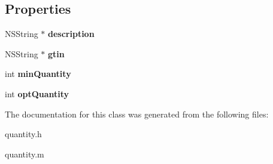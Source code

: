 \subsection*{Properties}
\begin{DoxyCompactItemize}
\item 
\hypertarget{interfacequantity_a18c045268367276323bf5e08c2f19700}{}N\+S\+String $\ast$ {\bfseries description}\label{interfacequantity_a18c045268367276323bf5e08c2f19700}

\item 
\hypertarget{interfacequantity_ad349079140178811c30dfb8d3fd2b238}{}N\+S\+String $\ast$ {\bfseries gtin}\label{interfacequantity_ad349079140178811c30dfb8d3fd2b238}

\item 
\hypertarget{interfacequantity_afd0918ba8a50587867361bd4bc9bf5f6}{}int {\bfseries min\+Quantity}\label{interfacequantity_afd0918ba8a50587867361bd4bc9bf5f6}

\item 
\hypertarget{interfacequantity_a68df267fe150aa4ed5343a03e697aa7b}{}int {\bfseries opt\+Quantity}\label{interfacequantity_a68df267fe150aa4ed5343a03e697aa7b}

\end{DoxyCompactItemize}


The documentation for this class was generated from the following files\+:\begin{DoxyCompactItemize}
\item 
quantity.\+h\item 
quantity.\+m\end{DoxyCompactItemize}
